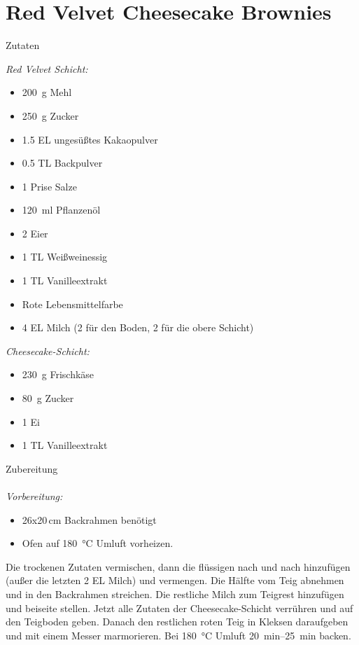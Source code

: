\section*{Red Velvet Cheesecake Brownies}
\ihead{}\ohead{}
\cfoot{}
{\Large Zutaten}
\begin{multicols}{2}
\textit{Red Velvet Schicht:}
\begin{itemize}
    \item \SI{200}{g} Mehl
    \item \SI{250}{g} Zucker
    \item \num{1.5} EL ungesüßtes Kakaopulver
    \item \num{0.5} TL Backpulver
    \item \num{1} Prise Salze
    \item \SI{120}{ml} Pflanzenöl
    \item \num{2} Eier
    \item \num{1} TL Weißweinessig
    \item \num{1} TL Vanilleextrakt
    \item Rote Lebensmittelfarbe
    \item \num{4} EL Milch (\num{2} für den Boden, \num{2} für die obere Schicht)
\end{itemize}
\textit{Cheesecake-Schicht:}
\begin{itemize}
    \item \SI{230}{g} Frischkäse
    \item \SI{80}{g} Zucker
    \item \num{1} Ei
    \item \num{1} TL Vanilleextrakt
\end{itemize}
\end{multicols}
\noindent
{\Large Zubereitung}\\
\\
\textit{Vorbereitung:} 
\begin{itemize}
    \item \num{26}x\num{20}\,\si{cm} Backrahmen benötigt
    \item Ofen auf \SI{180}{\celsius} Umluft vorheizen.
\end{itemize}
Die trockenen Zutaten vermischen, dann die flüssigen nach und nach hinzufügen (außer die letzten \num{2} EL Milch) und vermengen.
Die Hälfte vom Teig abnehmen und in den Backrahmen streichen. 
Die restliche Milch zum Teigrest hinzufügen und beiseite stellen.
Jetzt alle Zutaten der Cheesecake-Schicht verrühren und auf den Teigboden geben.
Danach den restlichen roten Teig in Kleksen daraufgeben und mit einem Messer marmorieren. 
Bei \SI{180}{\celsius} Umluft \SIrange{20}{25}{min} backen.
